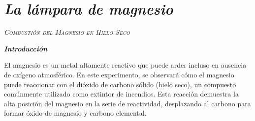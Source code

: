 \section{\textit{\textbf{La lámpara de magnesio}}} 
\textit{\textsc{Combustión del Magnesio en Hielo Seco}}

    \textit{\textbf{Introducción}}  
    
    El magnesio es un metal altamente reactivo que puede arder incluso en ausencia de oxígeno atmosférico. En este experimento, se observará cómo el magnesio puede reaccionar con el dióxido de carbono sólido (hielo seco), un compuesto comúnmente utilizado como extintor de incendios. Esta reacción demuestra la alta posición del magnesio en la serie de reactividad, desplazando al carbono para formar óxido de magnesio y carbono elemental.  
    
